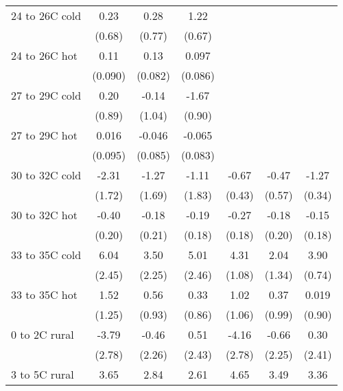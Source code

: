 \documentclass[paper=letterpaper, fontsize=11pt]{article} %
\begin{document}
\begin{longtable}{l*{6}{c}}
24 to 26C cold      &        0.23&        0.28&        1.22&            &            &            \\
                    &      (0.68)&      (0.77)&      (0.67)&            &            &            \\
24 to 26C hot       &        0.11&        0.13&       0.097&            &            &            \\
                    &     (0.090)&     (0.082)&     (0.086)&            &            &            \\
27 to 29C cold      &        0.20&       -0.14&       -1.67&            &            &            \\
                    &      (0.89)&      (1.04)&      (0.90)&            &            &            \\
27 to 29C hot       &       0.016&      -0.046&      -0.065&            &            &            \\
                    &     (0.095)&     (0.085)&     (0.083)&            &            &            \\
30 to 32C cold      &       -2.31&       -1.27&       -1.11&       -0.67&       -0.47&       -1.27\\
                    &      (1.72)&      (1.69)&      (1.83)&      (0.43)&      (0.57)&      (0.34)\\
30 to 32C hot       &       -0.40&       -0.18&       -0.19&       -0.27&       -0.18&       -0.15\\
                    &      (0.20)&      (0.21)&      (0.18)&      (0.18)&      (0.20)&      (0.18)\\
33 to 35C cold      &        6.04&        3.50&        5.01&        4.31&        2.04&        3.90\\
                    &      (2.45)&      (2.25)&      (2.46)&      (1.08)&      (1.34)&      (0.74)\\
33 to 35C hot       &        1.52&        0.56&        0.33&        1.02&        0.37&       0.019\\
                    &      (1.25)&      (0.93)&      (0.86)&      (1.06)&      (0.99)&      (0.90)\\
0 to 2C rural       &       -3.79&       -0.46&        0.51&       -4.16&       -0.66&        0.30\\
                    &      (2.78)&      (2.26)&      (2.43)&      (2.78)&      (2.25)&      (2.41)\\
3 to 5C rural       &        3.65&        2.84&        2.61&        4.65&        3.49&        3.36\\

\end{longtable}
\end{document}
